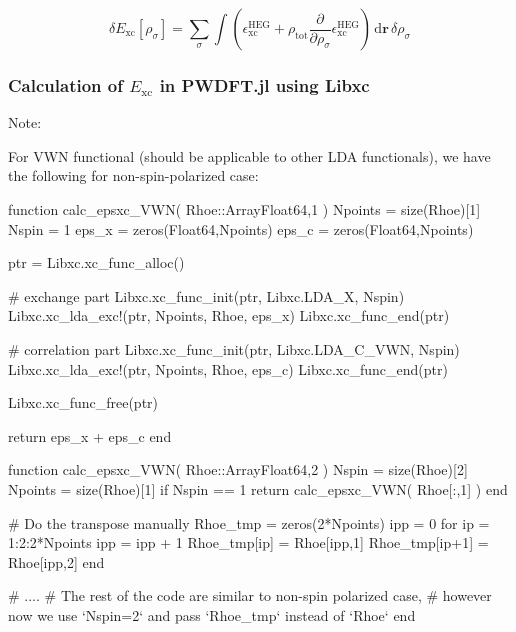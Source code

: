 \begin{equation}
\delta E_{\mathrm{xc}}\left[\rho_{\sigma}\right] =
\sum_{\sigma} \int
\left(
\epsilon^{\mathrm{HEG}}_{\mathrm{xc}} +
\rho_{\mathrm{tot}} \frac{\partial}{\partial \rho_{\sigma}} \epsilon^{\mathrm{HEG}}_{\mathrm{xc}}
\right)
\, \mathrm{d}\mathbf{r}\,\delta \rho_{\sigma}
\end{equation}


\subsubsection{Calculation of $E_{\mathrm{xc}}$ in \textsf{PWDFT.jl} using Libxc}

Note:

For VWN functional (should be applicable to other LDA functionals), we have the following
for non-spin-polarized case:
%
\begin{juliacode}
function calc_epsxc_VWN( Rhoe::Array{Float64,1} )
  Npoints = size(Rhoe)[1]
  Nspin = 1
  eps_x = zeros(Float64,Npoints)
  eps_c = zeros(Float64,Npoints)

  ptr = Libxc.xc_func_alloc()
  
  # exchange part
  Libxc.xc_func_init(ptr, Libxc.LDA_X, Nspin)
  Libxc.xc_lda_exc!(ptr, Npoints, Rhoe, eps_x)
  Libxc.xc_func_end(ptr)

  # correlation part
  Libxc.xc_func_init(ptr, Libxc.LDA_C_VWN, Nspin)
  Libxc.xc_lda_exc!(ptr, Npoints, Rhoe, eps_c)
  Libxc.xc_func_end(ptr)

  Libxc.xc_func_free(ptr)

  return eps_x + eps_c
end
\end{juliacode}


\begin{juliacode}
function calc_epsxc_VWN( Rhoe::Array{Float64,2} )
  Nspin = size(Rhoe)[2]
  Npoints = size(Rhoe)[1]
  if Nspin == 1
    return calc_epsxc_VWN( Rhoe[:,1] )
  end

  # Do the transpose manually
  Rhoe_tmp = zeros(2*Npoints)
  ipp = 0
  for ip = 1:2:2*Npoints
    ipp = ipp + 1
    Rhoe_tmp[ip] = Rhoe[ipp,1]
    Rhoe_tmp[ip+1] = Rhoe[ipp,2]
  end

  # ....
  # The rest of the code are similar to non-spin polarized case,
  # however now we use `Nspin=2` and pass `Rhoe_tmp` instead of `Rhoe`
end
\end{juliacode}


